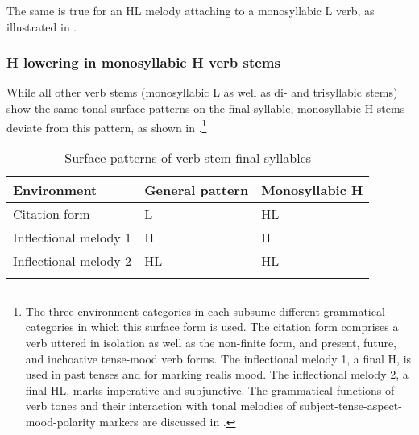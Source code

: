 The same is true for an HL melody attaching to a monosyllabic L verb, as illustrated in .








\newpage
\subsubsection{H lowering in monosyllabic H verb stems}
\label{sec:ToneLower}

While all other verb stems (monosyllabic L as well as di- and trisyllabic stems) show the same tonal surface patterns on the final syllable, monosyllabic H stems deviate from this pattern, as shown in .\footnote{The three environment categories in  each subsume different grammatical categories in which this surface form is used. The citation form comprises a verb uttered in isolation as well as the non-finite form, and present, future, and inchoative tense-mood verb forms. The inflectional melody 1, a final H, is used in past tenses and for marking realis mood. The inflectional melody 2, a final HL, marks imperative and subjunctive. The grammatical functions of verb tones and their interaction with tonal melodies of subject-tense-aspect-mood-polarity markers are discussed in .}


\begin{table}
\begin{tabular}{lll}
\lsptoprule
Environment  			& 	General pattern		& Monosyllabic H \\
 \midrule
Citation form 			& 	L 				&  HL		\\
Inflectional melody 1		& 	H 				& H 			\\
Inflectional melody 2 	& 	HL 				& HL 		\\
 \lspbottomrule
\end{tabular}
\caption{Surface patterns of verb stem-final syllables}
\label{Tab:Vpattsurf}
\end{table}




